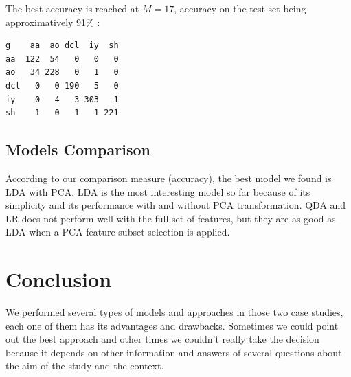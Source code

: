 \documentclass[]{report}
\begin{document}
The best accuracy is reached at $M = 17$, accuracy on the test set being approximatively 91\% : 
\begin{verbatim}
g    aa  ao dcl  iy  sh
aa  122  54   0   0   0
ao   34 228   0   1   0
dcl   0   0 190   5   0
iy    0   4   3 303   1
sh    1   0   1   1 221
\end{verbatim}

\section{Models Comparison}

According to our comparison measure (accuracy), the best model we found is LDA with PCA. LDA is the most interesting model so far because of its simplicity and its performance with and without PCA transformation. QDA and LR does not perform well with the full set of features, but they are as good as LDA when a PCA feature subset selection is applied.  

\newpage
\chapter*{Conclusion}
We performed several types of models and approaches in those two case studies, each one of them has its advantages and drawbacks. Sometimes we could point out the best approach and other times we couldn't really take the decision because it depends on other information and answers of several questions about the aim of the study and the context.
\end{document}
